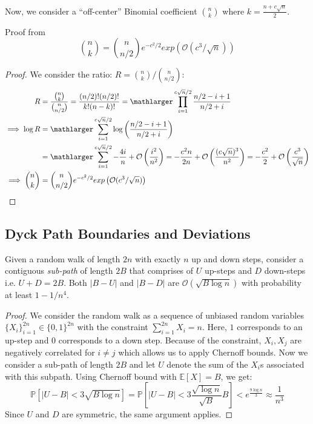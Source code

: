 Now, we consider a ``off-center'' Binomial coefficient $\binom{n}{k}$ where $k = \frac{n+c\sqrt n}{2}$.
\begin{lemma}
\label{lem:close_to_central_binomial_coefficient}
Proof from \cite{asymptopia}
\[
\binom{n}{k} = \binom{n}{n/2} e^{-c^2/2}exp\left( \mathcal O(c^3/\sqrt n)\right)
\]
\end{lemma}
\begin{proof}
We consider the ratio: $R = \binom{n}{k}/\binom{n}{n/2}$:
\begin{align}
R &= \frac{\binom{n}{k}}{\binom{n}{n/2}}
= \frac{(n/2)!(n/2)!}{k!(n-k)!} = \mathlarger\prod\limits_{i=1}^{c\sqrt n/2}\frac{n/2-i+1}{n/2+i}\\
\implies \log R &= \mathlarger\sum\limits_{i=1}^{c\sqrt n/2}\log\left(\frac{n/2-i+1}{n/2+i} \right)\\
&= \mathlarger\sum\limits_{i=1}^{c\sqrt n/2} - \frac{4i}{n} + \mathcal O\left( \frac{i^2}{n^2}\right)
= - \frac{c^2n}{2n} + \mathcal O\left( \frac{(c\sqrt n)^3}{n^2}\right)
= - \frac{c^2}{2} + \mathcal O\left( \frac{c^3}{\sqrt n}\right)\\
\implies \binom{n}{k} &= \binom{n}{n/2} e^{-c^2/2}exp\left( \mathcal O(c^3/\sqrt n)\right)
\end{align}
\end{proof}



\subsection{Dyck Path Boundaries and Deviations}%
\label{sec:dyck_path_boundaries_and_deviations}
\begin{lemma}
\label{lem:random_walk_deviation_bound}
Given a random walk of length $2n$ with exactly $n$ up and down steps,
consider a contiguous \emph{sub-path} of length $2B$ that comprises of $U$ up-steps and $D$ down-steps i.e. $U + D = 2B$.
Both $|B-U|$ and $|B-D|$ are $\mathcal O(\sqrt{B\log n})$ with probability at least $1-1/n^4$.
\end{lemma}
\begin{proof}
We consider the random walk as a sequence of unbiased random variables $\{X_i\}_{i=1}^{2n}\in \{0,1\}^{2n}$
with the constraint $\sum\limits_{i=1}^{2n}X_i = n$.
Here, $1$ corresponds to an up-step and $0$ corresponds to a down step.
Because of the constraint, $X_i, X_j$ are negatively correlated for $i \not= j$ which allows us to apply Chernoff bounds.
Now we consider a sub-path of length $2B$ and let $U$ denote the sum of the $X_i$s associated with this subpath.
Using Chernoff bound with $\mathbb E[X] = B$, we get:
\[
\mathbb P\left[ |U-B| < 3\sqrt{B \log n}\right]
= \mathbb P\left[ |U-B| < 3\frac{\sqrt{\log n}}{\sqrt B}B\right] < e^{\frac{9\log n}{3}} \approx \frac{1}{n^3}
\]
Since $U$ and $D$ are symmetric, the same argument applies.
\end{proof}

